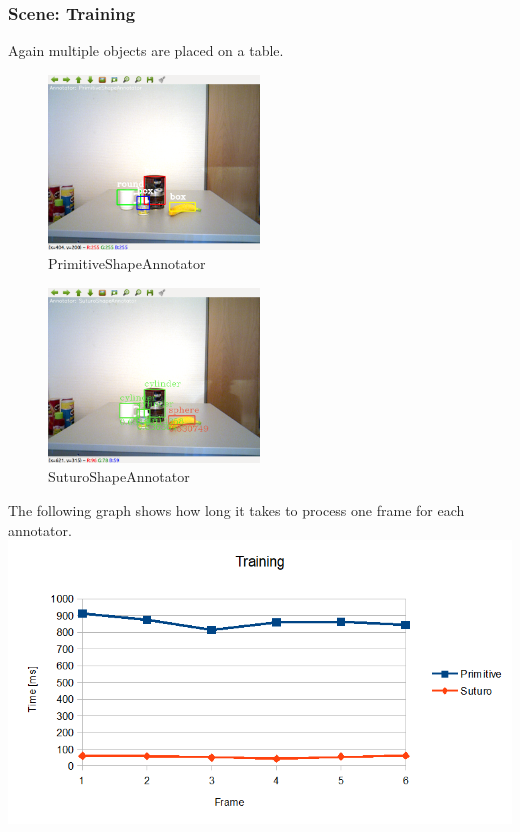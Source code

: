 \documentclass[main.tex]{subfiles}
\begin{document}
\subsubsection{Scene: Training}
Again multiple objects are placed on a table.
\begin{figure}
  \center
  \includegraphics[width=0.5\textwidth]{pictures/perception/shape_annotator/classification_test_training/primitive.png}
  \caption{PrimitiveShapeAnnotator}
  \label{fig:shapeAnnotatorShelvePrimitive}
\end{figure}
\begin{figure}
  \center
  \includegraphics[width=0.5\textwidth]{pictures/perception/shape_annotator/classification_test_training/suturo.png}
  \caption{SuturoShapeAnnotator}
  \label{fig:shapeAnnotatorShelveSuturo}
\end{figure}

The following graph shows how long it takes to process one frame for each annotator.
{\center
  \includegraphics[width=1.2\textwidth]{pictures/perception/shape_annotator/classification_test_training/chart.png}
}
\end{document}
